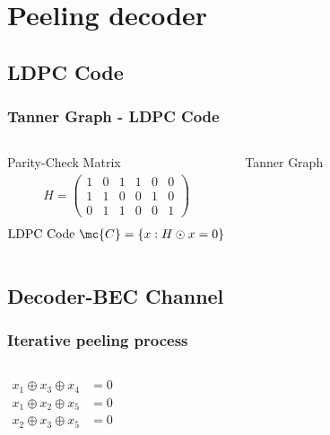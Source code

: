 \section{Peeling decoder}
\subsection{LDPC Code}

\begin{frame}\frametitle{Tanner Graph - LDPC Code}
\begin{columns}

\begin{defn}{Parity-Check Matrix}
\centering
\begin{align*}
H=
\begin{pmatrix}
1 & 0 & 1 & 1 & 0 & 0\\
1 & 1 & 0 & 0 & 1 & 0\\
0 & 1 & 1 & 0 & 0 & 1
\end{pmatrix}
\end{align*}
\vspace{6ex}
\begin{align*}
\text{LDPC Code } \mc{C}=\{x: H\odot x=0 \}
\end{align*}
\end{defn}

\pause

\begin{defn}{Tanner Graph}
\centering
\vspace{0.6cm}
\resizebox{\textwidth}{!}{}
\end{defn}

\end{columns}
\end{frame}

\subsection{Decoder-BEC Channel}
\begin{frame}
\frametitle{Iterative peeling process}
\begin{columns}
\begin{align*}
x_1\oplus x_3\oplus x_4&=0\\
x_1\oplus x_2\oplus x_5&=0\\
x_2\oplus x_3\oplus x_5&=0
\end{align*}

\vspace{0.2cm}
\centering
{}

\resizebox{0.9\textwidth}{!}{}
\end{columns}
\end{frame}

